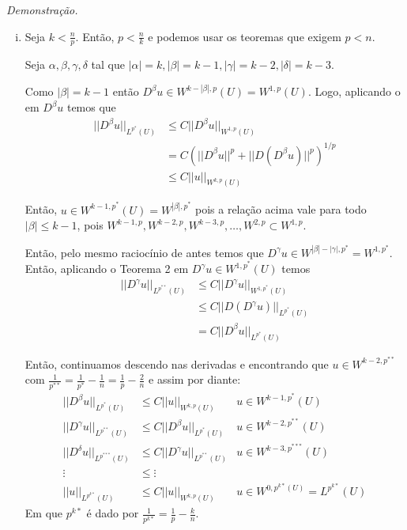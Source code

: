 \documentclass[11pt]{article}
\begin{document}
\textit{Demonstração.}\begin{enumerate}[(i)]
	\item Seja $k < \frac{n}{p}$. Então, \( p < \frac{n}{k} \) e podemos usar os teoremas que exigem $p<n$.
	
	Seja $\alpha, \beta, \gamma, \delta$ tal que $|\alpha|=k, |\beta|=k-1, |\gamma|=k-2, |\delta|=k-3$.
	
	Como $|\beta|=k-1$ então $D^\beta u \in W^{k - |\beta|,p}(U) = W^{1,p}(U)$. Logo, aplicando o  em $D^\beta u$ temos que  \begin{align*}
		||D^\beta u||_{L^{p^*}(U)} &\leq C || D^\beta u ||_{W^{1,p}(U)} \\ &= C\left( ||D^\beta u||^p + ||D(D^\beta u)||^p \right)^{1/p} \\
		&\leq C ||u||_{W^{k,p}(U)}
	\end{align*}
	
	Então, $u \in W^{k-1,p^*}(U) = W^{|\beta|, p^*}$ pois a relação acima vale para todo $|\beta|\leq k-1$, pois $ W^{k-1,p}, W^{k-2,p}, W^{k-3,p}, \ldots, W^{2,p} \subset W^{1,p} $.
	
	Então, pelo mesmo raciocínio de antes temos que $ D^\gamma u \in W^{|\beta| - |\gamma|,p^*} = W^{1,p^*} $. Então, aplicando o Teorema 2 em $D^\gamma u \in W^{1,p^*}(U)$ temos \begin{align*}
		||D^\gamma u||_{L^{p^{**}}(U)} &\leq C ||D^\gamma u ||_{W^{1,p^*}(U)} \\ &\leq C ||D(D^\gamma u)||_{L^{p^*}(U)}\\ &= C ||D^\beta u||_{L^{p^*}(U)}
	\end{align*}
	
	Então, continuamos descendo nas derivadas e encontrando que $u \in W^{k-2, p^{**}}$ com $\frac{1}{p^{**}} = \frac{1}{p^*} - \frac{1}{n} = \frac{1}{p} - \frac{2}{n}$ e assim por diante: \begin{align*}
		||D^\beta u||_{L^{p^*}(U)} &\leq C ||u||_{W^{k,p}(U)} & u \in W^{k-1,p^*}(U)\\
		||D^\gamma u||_{L^{p^{**}}(U)} &\leq C ||D^\beta u||_{L^{p^*}(U)} & u \in W^{k-2, p^{**}}(U) \\
		||D^\delta u||_{L^{p^{***}}(U)} &\leq C ||D^\gamma u||_{L^{p^{**}}(U)} & u \in W^{k-3, p^{***}}(U) \\
		\vdots &\leq \vdots \\
		||u||_{L^{p^{k*}}(U)} &\leq C ||u||_{W^{k,p}(U)} & u \in W^{0, p^{k*}(U)} = L^{p^{k*}}(U)  
	\end{align*}
	Em que $ p^{k*} $ é dado por $ \frac{1}{p^{k*}} = \frac{1}{p} - \frac{k}{n} $. 
	

\end{enumerate}
\end{document}
